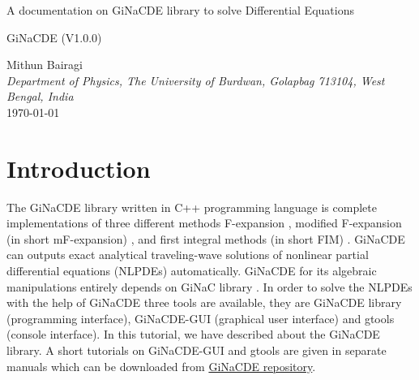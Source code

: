 \documentclass[prd,aps,floats,showkeys,nofootinbib,notitlepage]{revtex4-2}
\begin{document}
	\begin{titlepage}
		\begin{center}
			\Huge {A documentation on GiNaCDE library to solve Differential Equations} 
		\end{center}
		\vspace{3cm}
		\begin{center}
			\Large{GiNaCDE (V1.0.0)}
		\end{center}
		\vspace{2cm} 
		\begin{center} 
			Mithun Bairagi \\[3pt]  
			\textit{Department of Physics, The University of Burdwan, Golapbag 713104, West Bengal, India} \\ [1cm]
			\today
		\end{center}
	\end{titlepage}
	
	\clearpage
	
	\tableofcontents
	
	\section{Introduction}
	The GiNaCDE library written in C++ programming language is complete implementations of three different methods F-expansion \cite{fexpn024,fexpn024_1,fexpn123,0246,234}, modified F-expansion (in short mF-expansion) \cite{modfexpn}, and first integral methods (in short FIM) \cite{fim0,fim,mirza,complexTwt1}. GiNaCDE can outputs exact analytical traveling-wave solutions of nonlinear partial differential equations (NLPDEs) automatically.
	GiNaCDE for its algebraic manipulations entirely depends on GiNaC library \cite{ginac}.  
	In order to solve the NLPDEs with the help of GiNaCDE three tools are available, they are GiNaCDE library (programming interface), GiNaCDE-GUI (graphical user interface) and gtools (console interface). In this tutorial, we have described about the GiNaCDE library. A short tutorials on GiNaCDE-GUI and gtools are given in separate manuals which can be downloaded from \href{https://github.com/mithun218/GiNaCDE}{GiNaCDE repository}.
\end{document}
